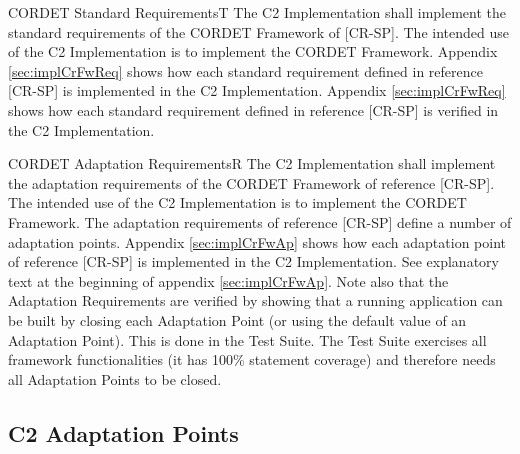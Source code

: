 \documentclass{pnp_article}
\begin{document}
\begin{fwReq}{CORDET Standard Requirements}{T}
{The C2 Implementation shall implement the standard requirements of the CORDET Framework of [CR-SP].}
{The intended use of the C2 Implementation is to implement the CORDET Framework.}
{Appendix \ref{sec:implCrFwReq} shows how each standard requirement defined in reference [CR-SP] is implemented in the C2 Implementation.} 
{Appendix \ref{sec:implCrFwReq} shows how each standard requirement defined in reference [CR-SP] is verified in the C2 Implementation.} 
\end{fwReq}


\newpage
\begin{fwReq}{CORDET Adaptation Requirements}{R}
{The C2 Implementation shall implement the adaptation requirements of the CORDET Framework of reference [CR-SP].}
{The intended use of the C2 Implementation is to implement the CORDET Framework.}
{The adaptation requirements of reference [CR-SP] define a number of adaptation points. Appendix \ref{sec:implCrFwAp} shows how each adaptation point of reference [CR-SP] is implemented in the C2 Implementation. } 
{See explanatory text at the beginning of appendix \ref{sec:implCrFwAp}. Note also that the Adaptation Requirements are verified by showing that a running application can be built by closing each Adaptation Point (or using the default value of an Adaptation Point). This is done in the Test Suite. The Test Suite exercises all framework functionalities (it has 100\% statement coverage) and therefore needs all Adaptation Points to be closed.}
\end{fwReq}

\subsection{C2 Adaptation Points}
\end{document}
